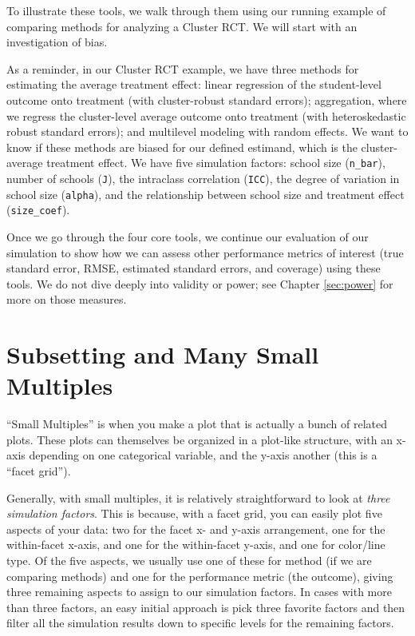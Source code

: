 \documentclass[
]{book}
\begin{document}
To illustrate these tools, we walk through them using our running example of comparing methods for analyzing a Cluster RCT.
We will start with an investigation of bias.

As a reminder, in our Cluster RCT example, we have three methods for estimating the average treatment effect: linear regression of the student-level outcome onto treatment (with cluster-robust standard errors); aggregation, where we regress the cluster-level average outcome onto treatment (with heteroskedastic robust standard errors); and multilevel modeling with random effects.
We want to know if these methods are biased for our defined estimand, which is the cluster-average treatment effect.
We have five simulation factors: school size (\texttt{n\_bar}), number of schools (\texttt{J}), the intraclass correlation (\texttt{ICC}), the degree of variation in school size (\texttt{alpha}), and the relationship between school size and treatment effect (\texttt{size\_coef}).

Once we go through the four core tools, we continue our evaluation of our simulation to show how we can assess other performance metrics of interest (true standard error, RMSE, estimated standard errors, and coverage) using these tools.
We do not dive deeply into validity or power; see Chapter \ref{sec:power} for more on those measures.

\section{Subsetting and Many Small Multiples}\label{subsetting-and-many-small-multiples}

``Small Multiples'' is when you make a plot that is actually a bunch of related plots.
These plots can themselves be organized in a plot-like structure, with an x-axis depending on one categorical variable, and the y-axis another (this is a ``facet grid'').

Generally, with small multiples, it is relatively straightforward to look at \emph{three simulation factors}.
This is because, with a facet grid, you can easily plot five aspects of your data: two for the facet x- and y-axis arrangement, one for the within-facet x-axis, and one for the within-facet y-axis, and one for color/line type.
Of the five aspects, we usually use one of these for method (if we are comparing methods) and one for the performance metric (the outcome), giving three remaining aspects to assign to our simulation factors.
In cases with more than three factors, an easy initial approach is pick three favorite factors and then filter all the simulation results down to specific levels for the remaining factors.
\end{document}
